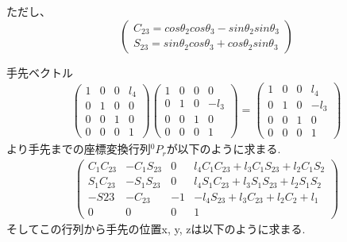 \documentclass[a4j]{jarticle}			%
\begin{document}
\begin{multicols}{2}
ただし、
\begin{equation*}
	\left(
	\begin{split}
		C_{23} = cos\theta_2cos\theta_3-sin\theta_2sin\theta_3\\
		S_{23} = sin\theta_2cos\theta_3+cos\theta_2sin\theta_3	
	\end{split}
	\right)
\end{equation*}

手先ベクトル
\tiny
\begin{equation*}
	\begin{array}{cccc}
		\left( 
			\begin{array}{cccc}
				1 & 0 & 0 & l_4\\
				0 & 1 & 0 & 0\\
				0 & 0 & 1 & 0\\
				0 & 0 & 0 & 1 
			\end{array}
		\right)
		\left( 
			\begin{array}{cccc}
				1 & 0 & 0 & 0\\
				0 & 1 & 0 & -l_3\\
				0 & 0 & 1 & 0\\
				0 & 0 & 0 & 1 
			\end{array}
			\right)
		=
		\left( 
		\begin{array}{cccc}
			1 & 0 & 0 & l_4\\
			0 & 1 & 0 & -l_3\\
			0 & 0 & 1 & 0\\
			0 & 0 & 0 & 1 
		\end{array}
		\right)
	\end{array}
\end{equation*}
\small
より手先までの座標変換行列$^{0}P_{r}$が以下のように求まる.
\tiny
\begin{equation*}
	\begin{array}{cc}
		\left( 
			\begin{array}{cccc}
				C_1C_{23} & -C_1S_{23} & 0 & l_4C_1C_{23}+l_3C_1S_{23}+l_2C_1S_2 \\
				S_1C_{23} & -S_1S_{23} & 0 & l_4S_1C_{23}+l_3S_1S_{23}+l_2S_1S_2 \\
				-S{23} & -C_{23} & -1 & -l_4S_{23}+l_3C_{23}+l_2C_2+l_1 \\
				0 & 0 & 0 & 1 
			\end{array}
		\right)
	\end{array}
\end{equation*}
\small
そしてこの行列から手先の位置x, y, zは以下のように求まる.
\begin{equation*}

\end{equation*}
\end{multicols}
\end{document}
